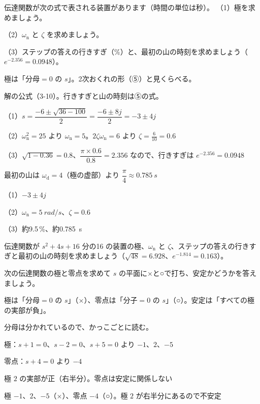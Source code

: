 \begin{reidai}[2次おくれの極と行きすぎ]
伝達関数が次の式で表される装置があります（時間の単位は秒）。
（1）極を求めましょう。\par
（2）$\omega_{\mathrm n}$ と $\zeta$ を求めましょう。\par
（3）ステップの答えの行きすぎ（\%）と、最初の山の時刻を求めましょう（$e^{-2.356}=0.0948$）。\par
\kangaekata {}\par
{}\enspace 極は「分母$=0$ の $s$」。2次おくれの形（⑤）と見くらべる。\par
{}\enspace 解の公式（3-10）。行きすぎと山の時刻は⑤の式。\par
\shiki\kixjs{}\zw{} （1）$s=\dfrac{-6\pm\sqrt{36-100}}{2}=\dfrac{-6\pm8j}{2}=-3\pm4j$\par
\kixja （2）$\omega_{\mathrm n}^2=25$ より $\omega_{\mathrm n}=5$。$2\zeta\omega_{\mathrm n}=6$ より $\zeta=\frac{6}{10}=0.6$\par
\kixja （3）$\sqrt{1-0.36}=0.8$、$\dfrac{\pi\times0.6}{0.8}=2.356$ なので、行きすぎは $e^{-2.356}=0.0948$\par
\kixjb 最初の山は $\omega_{\mathrm d}=4$（極の虚部）より $\dfrac{\pi}{4}\approx\qty{0.785}{s}$\par
\kotae\kixjs{}\zw{} （1）$-3\pm4j$\par
\kixja （2）$\omega_{\mathrm n}=\qty{5}{rad/s}$、$\zeta=0.6$\par
\kixja （3）約9.5\,\%、約\qty{0.785}{s}
\end{reidai}

\begin{jibun}
伝達関数が $s^2+4s+16$ 分の16 の装置の極、$\omega_{\mathrm n}$ と $\zeta$、ステップの答えの行きすぎと最初の山の時刻を求めましょう（$\sqrt{48}=6.928$、$e^{-1.814}=0.163$）。
\end{jibun}

\begin{reidai}[零点と極]
次の伝達関数の極と零点を求めて $s$ の平面に×と○で打ち、安定かどうかを答えましょう。
\kangaekata {}\par
{}\enspace 極は「分母$=0$ の $s$」（×）、零点は「分子$=0$ の $s$」（○）。安定は「すべての極の実部が負」。\par
{}\enspace 分母は分かれているので、かっこごとに読む。\par
\shiki\kixjs{}\zw{} 極：$s+1=0$、$s-2=0$、$s+5=0$ より $-1$、$2$、$-5$\par
\kixja 零点：$s+4=0$ より $-4$\par
\kixja 極 $2$ の実部が正（右半分）。零点は安定に関係しない\par
\kotae\kixjs{}\zw{} 極 $-1$、$2$、$-5$（×）、零点 $-4$（○）。極 $2$ が右半分にあるので不安定
\end{reidai}


